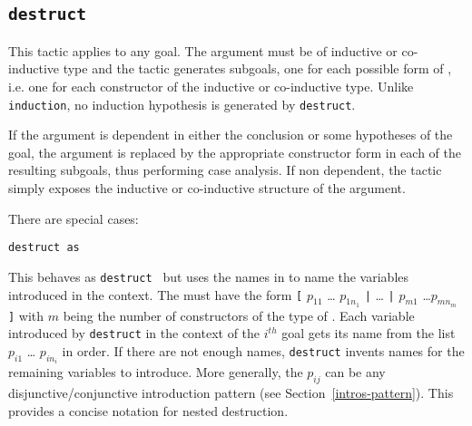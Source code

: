 \begin{coq_example*}
\subsection{\tt destruct \term}
\label{destruct}

This tactic applies to any goal. The argument {\term} must be of
inductive or co-inductive type and the tactic generates subgoals, one
for each possible form of {\term}, i.e. one for each constructor of
the inductive or co-inductive type. Unlike {\tt induction}, no
induction hypothesis is generated by {\tt destruct}.

If the argument is dependent in either the conclusion or some
hypotheses of the goal, the argument is replaced by the appropriate
constructor form in each of the resulting subgoals, thus performing
case analysis. If non dependent, the tactic simply exposes the
inductive or co-inductive structure of the argument.

There are special cases:


\begin{Variants}
\item{\tt destruct {\term} as {\disjconjintropattern}}

  This behaves as {\tt destruct {\term}} but uses the names in
  {\intropattern} to name the variables introduced in the context.
  The {\intropattern} must have the form {\tt [} $p_{11}$ \ldots
  $p_{1n_1}$ {\tt |} {\ldots} {\tt |} $p_{m1}$ \ldots $p_{mn_m}$ {\tt
    ]} with $m$ being the number of constructors of the type of
  {\term}. Each variable introduced by {\tt destruct} in the context
  of the $i^{th}$ goal gets its name from the list $p_{i1}$ \ldots
  $p_{in_i}$ in order. If there are not enough names, {\tt destruct}
  invents names for the remaining variables to introduce. More
  generally, the $p_{ij}$ can be any disjunctive/conjunctive
  introduction pattern (see Section~\ref{intros-pattern}). This
  provides a concise notation for nested destruction.


\end{Variants}
\end{coq_example*}

